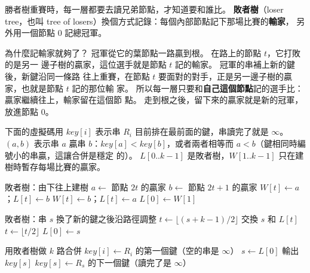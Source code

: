勝者樹重賽時，每一層都要去讀兄弟節點，才知道要和誰比。 \textbf{敗者樹}（loser
tree，也叫 tree of losers）換個方式記錄：每個內部節點記下那場比賽的\textbf{輸家}，
另外用一個節點 $0$ 記總冠軍。

為什麼記輸家就夠了？ 冠軍從它的葉節點一路贏到根。 在路上的節點 $t$，它打敗的是另一
邊子樹的贏家，這位選手就是節點 $t$ 記的輸家。 冠軍的串補上新的鍵後，新鍵沿同一條路
往上重賽，在節點 $t$ 要面對的對手，正是另一邊子樹的贏家，也就是節點 $t$ 記的那位輸
家。 所以每一層只要和\textbf{自己這個節點}記的選手比：贏家繼續往上，輸家留在這個節
點。 走到根之後，留下來的贏家就是新的冠軍，放進節點 $0$。

下面的虛擬碼用 $\mathit{key}[i]$ 表示串 $R_i$ 目前排在最前面的鍵，串讀完了就是
$\infty$。 $(a, b)$ 表示串 $a$ 贏串 $b$：$\mathit{key}[a] <
\mathit{key}[b]$，或者兩者相等而 $a < b$（鍵相同時編號小的串贏，這讓合併是穩定
的）。 $L[0..k-1]$ 是敗者樹，$W[1..k-1]$ 只在建樹時暫存每場比賽的贏家。

\begin{pseudo}[label=alg:lin-loser, unbreakable]{敗者樹：由下往上建樹}
        \State $a \gets$ 節點 $2t$ 的贏家 
        \State $b \gets$ 節點 $2t + 1$ 的贏家
            \State $W[t] \gets a$；$L[t] \gets b$
        \Else
            \State $W[t] \gets b$；$L[t] \gets a$
        \EndIf
    \EndFor
    \State $L[0] \gets W[1]$
\EndProcedure
\end{pseudo}

\begin{pseudo}[label=alg:lin-adjust, unbreakable]{敗者樹：串 $s$ 換了新的鍵之後沿路徑調整}
 
    \State $t \gets \lfloor (s + k - 1) / 2 \rfloor$ 
            \State 交換 $s$ 和 $L[t]$ 
        \EndIf
        \State $t \gets \lfloor t / 2 \rfloor$
    \EndWhile
    \State $L[0] \gets s$
\EndProcedure
\end{pseudo}

\begin{pseudo}[label=alg:lin-kmerge]{用敗者樹做 $k$ 路合併}
        \State $\mathit{key}[i] \gets R_i$ 的第一個鍵（空的串是 $\infty$）
    \EndFor
    \State {}
        \State $s \gets L[0]$
        \State 輸出 $\mathit{key}[s]$
        \State $\mathit{key}[s] \gets R_s$ 的下一個鍵（讀完了是 $\infty$）
        \State {}
    \EndWhile
\EndProcedure
\end{pseudo}

